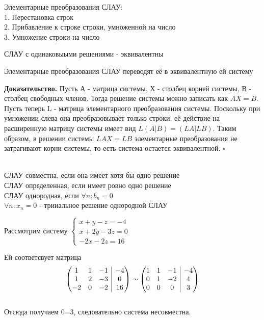 \begin{defin}
Элементарные преобразования СЛАУ:\\
1. Перестановка строк\\
2. Прибавление к строке строки, умноженной на число\\
3. Умножение строки на число
\end{defin}
\begin{defin}
СЛАУ с одинаковыыми решениями - эквивалентны
\end{defin}
\begin{theor}
Элементарные преобразования СЛАУ переводят её в эквивалентную ей систему
\end{theor}
\textbf{Доказательство.} Пусть А - матрица системы, Х - столбец корней 
системы, В - столбец свободных членов. Тогда решение системы можно записать
как $AX=B$. Пусть теперь L - матрица элементарного преобразования системы. 
Поскольку при умножении слева она преобразовывает только строки, её действие 
на расширенную матрицу системы имеет вид $L(A|B)=(LA|LB)$. Таким образом, в 
решении системы $LAX=LB$ элементарные преобразования не затрагивают корни
системы, то есть система остается эквивалентной. $\square$

\begin{defin}\makebox[5pt]{}\\
СЛАУ совместна, если она имеет хотя бы одно решение\\
СЛАУ определенная, если имеет ровно одно решение\\
СЛАУ однородная, если $\forall n: b_n=0 $\\
$\forall n: x_n=0 $ - трииальное решение однородной СЛАУ
\end{defin}
\begin{example} Рассмотрим систему 
$\begin{cases}
x+y-z=-4\\
x+2y-3z=0\\
-2x-2z=16
\end{cases}$
\end{example}
Ей соответсвует матрица \\
\begin{equation*}
 \begin{pmatrix}
  1&1&-1&\multicolumn{1}{|c}{-4}\\
  1&2&-3&\multicolumn{1}{|c}{0}\\
  -2&0&-2&\multicolumn{1}{|c}{16}
\end{pmatrix}   
\sim
\begin{pmatrix}
  1&1&-1&\multicolumn{1}{|c}{-4}\\
  0&1&-2&\multicolumn{1}{|c}{4}\\
  0&0&0&\multicolumn{1}{|c}{3}
\end{pmatrix}
\end{equation*}\\
Отсюда получаем 0=3, следовательно система несовместна.
  
